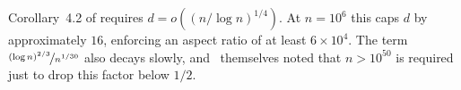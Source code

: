\documentclass{article}
\newcommand{\twonorm}[1]{\|#1\|_2}
\newcommand{\Ab}{\mathbf{A}}
\newcommand{\Eb}{\mathbf{E}}
\newcommand{\Pb}{\mathbf{P}}
\newcommand{\Abtil}{\tilde{\Ab}}
\newcommand{\rbr}[1]{\left(#1\right)}
\begin{document}
Corollary~4.2 of \citet{dexter2025stochastic} requires $d = o\rbr{(n/\log n)^{1/4}}$. At $n = 10^6$ this caps $d$ by approximately $16$, enforcing an aspect ratio of at least $6\times 10^4$. The term $\nicefrac{(\log n)^{2/3}}{n^{1/30}}$ also decays slowly, and~\citet{dexter2025stochastic} themselves noted that $n > 10^{50}$ is required just to drop this factor below $1/2$.

\end{document}
